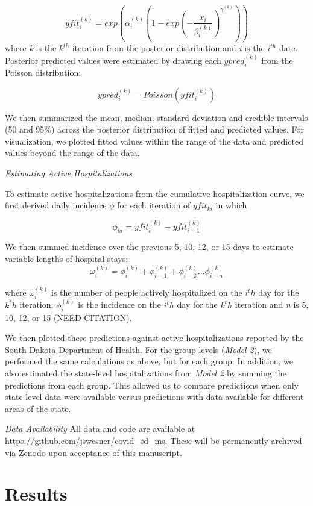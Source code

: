\documentclass[
]{article}
\begin{document}
\[yfit_i^{(k)} = exp(\alpha_i^{(k)}(1 - exp(-\frac{x_i}{\beta_i^{(k)}})^{\gamma_i^{(k)}}))\]
where \emph{k} is the \(k^{th}\) iteration from the posterior distribution and \emph{i} is the \(i^{th}\) date. Posterior predicted values were estimated by drawing each \(ypred_i^{(k)}\) from the Poisson distribution:

\[ypred_i^{(k)} = Poisson(yfit_i^{(k)})\]

We then summarized the mean, median, standard deviation and credible intervals (50 and 95\%) across the posterior distribution of fitted and predicted values. For visualization, we plotted fitted values within the range of the data and predicted values beyond the range of the data.

\emph{Estimating Active Hospitalizations}

To estimate active hospitalizations from the cumulative hospitalization curve, we first derived daily incidence \(\phi\) for each iteration of \(yfit_{ki}\) in which

\[\phi_{ki} = yfit_i^{(k)} - yfit_{i-1}^{(k)}\]

We then summed incidence over the previous 5, 10, 12, or 15 days to estimate variable lengths of hospital stays:
\[\omega_i^{(k)} = \phi_i^{(k)} + \phi_{i-1}^{(k)} + \phi_{i-2}^{(k)}...\phi_{i-n}^{(k)}\]

where \(\omega_i^{(k)}\) is the number of people actively hospitalized on the \(i^th\) day for the \(k^th\) iteration, \(\phi_i^{(k)}\) is the incidence on the \(i^th\) day for the \(k^th\) iteration and \emph{n} is 5, 10, 12, or 15 (NEED CITATION).

We then plotted these predictions against active hospitalizations reported by the South Dakota Department of Health. For the group levels (\emph{Model 2}), we performed the same calculations as above, but for each group. In addition, we also estimated the state-level hospitalizations from \emph{Model 2} by summing the predictions from each group. This allowed us to compare predictions when only state-level data were available versus predictions with data available for different areas of the state.

\emph{Data Availability}
All data and code are available at \url{https://github.com/jswesner/covid_sd_ms}. These will be permanently archived via Zenodo upon acceptance of this manuscript.

\hypertarget{results}{%
\section{Results}\label{results}}
\end{document}
